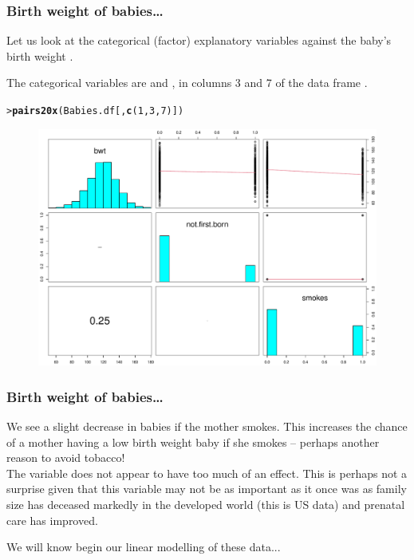 \documentclass{beamer}\usepackage[]{graphicx}\usepackage[]{xcolor}
\makeatletter
\newcommand{\hlnum}[1]{\textcolor[rgb]{0.686,0.059,0.569}{#1}}%
\newcommand{\hlstd}[1]{\textcolor[rgb]{0.345,0.345,0.345}{#1}}%
\newcommand{\hlkwd}[1]{\textcolor[rgb]{0.737,0.353,0.396}{\textbf{#1}}}%
\newenvironment{kframe}{%
 \def\at@end@of@kframe{}%
 \ifinner\ifhmode%
  \def\at@end@of@kframe{\end{minipage}}%
  \begin{minipage}{\columnwidth}%
 \fi\fi%
 \def\FrameCommand##1{\hskip\@totalleftmargin \hskip-\fboxsep
 \colorbox{shadecolor}{##1}\hskip-\fboxsep
     \hskip-\linewidth \hskip-\@totalleftmargin \hskip\columnwidth}%
 \MakeFramed {\advance\hsize-\width
   \@totalleftmargin\z@ \linewidth\hsize
   \@setminipage}}%
 {\par\unskip\endMakeFramed%
 \at@end@of@kframe}
\newenvironment{knitrout}{}{} %
\makeatother
\begin{document}
\begin{frame}[fragile]
\frametitle{Birth weight of babies\ldots}
Let us look at the categorical (factor) explanatory variables against the baby's birth weight .

The categorical variables are  and ,
in columns 3 and 7 of the data frame .

\begin{knitrout}\scriptsize
{}\color{fgcolor}\begin{kframe}
\begin{alltt}
\hlstd{> }\hlkwd{pairs20x}\hlstd{(Babies.df[,}\hlkwd{c}\hlstd{(}\hlnum{1}\hlstd{,}\hlnum{3}\hlstd{,}\hlnum{7}\hlstd{)])}
\end{alltt}
\end{kframe}
\end{knitrout}



\begin{figure}
  \centering
  \includegraphics[scale = 0.3]{figure/RC-H10-013}
\end{figure}

\end{frame}


\begin{frame}[fragile]
\frametitle{Birth weight of babies\ldots}
We see a slight decrease in babies  if the mother smokes. This increases the chance of a mother having a low birth weight baby if she smokes -- perhaps another reason to avoid tobacco!\\
\bigskip
The variable  does not appear to have too much of an effect. This is perhaps not a surprise given that this variable may not be as important as it once was as family size has deceased markedly in the developed world (this is US data) and prenatal care has improved.\\
\bigskip

We will know begin our linear modelling of these data...
\end{frame}
\end{document}
